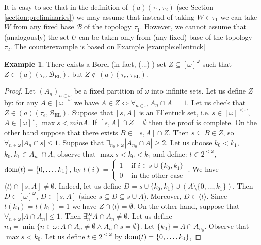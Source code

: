 \documentclass[12pt]{amsart}
\theoremstyle{plain}
\theoremstyle{definition}
\newtheorem{example}[theorem]{Example}
\theoremstyle{remark}
\newcommand{\dom}{{\rm dom}}
\newcommand{\finsub}{[\omega]^{<\omega}}
\newcommand{\infsub}{[\omega]^{\omega}}
\newcommand{\cB}{{\mathcal B}}
\newcommand{\aideal}{\mathit{(a)}}
\newcommand{\tauEllentuck}{\tau_{\mathrm{EL}}}
\newcommand{\baseEllentuck}{\cB_{\mathrm{EL}}}
\newcommand{\ninomega}{n\in\omega}
\begin{document}
It is easy to see that in the definition of $\aideal(\tau_1, \tau_2)$
(see Section \ref{section:preliminaries})
we may assume that instead of taking $W \in \tau_1$
we can take $W$ from any fixed base $\cB$ of the topology
$\tau_1$. However, we cannot assume that (analogously)
the set $U$ can be taken only from (any fixed) base of
the topology $\tau_2$. The counterexample is based 
on Example \ref{example:ellentuck}

\begin{example}
There exists a Borel (in fact,
(...)%
) set $Z \subseteq \infsub$ such that 
$Z \in \aideal(\tau_e, \baseEllentuck)$, but
$Z \not\in \aideal(\tau_e, \tauEllentuck)$.
\end{example}

\begin{proof}
Let $(A_n)_{n\in\omega}$ be a fixed partition of $\omega$ into infinite sets. 
Let us define $Z$ by:
for any $A\in\infsub$ 
we have $A\in Z \iff \forall_{n\in\omega} |A_n \cap A| = 1$.
Let us check that $Z\in\aideal(\tau_e, \baseEllentuck)$.
Suppose that $[s, A]$ is an Ellentuck set, i.e. $s\in\finsub$, $A\in\infsub$, $\max s < min A$. 
If $[s, A] \cap Z = \emptyset$ then
the proof is complete. On the other hand suppose that there exists $B \in [s, A] \cap Z$. Then $s \subseteq B \in Z$, so $\forall_{
\ninomega} |A_n \cap s| \leq 1$.
Suppose that $\exists_{n_0\in\omega} |A_{n_0} \cap A| \geq 2$. Let us choose $k_0 < k_1$, $k_0, k_1 \in A_{n_0} \cap A$, observe that $\max s < k_0 < k_1$ and define:
$t \in 2^{<\omega}$, 
$\dom(t) = \lbrace 0, \ldots, k_1\rbrace$, by  
$t(i) = \begin{cases}
     1 & \text{ if } i \in s \cup \lbrace k_0, k_1 \rbrace \\
     0 & \text{ in the other case }
\end{cases}$.
We have $\langle t \rangle \cap [s, A] \not= \emptyset$. Indeed, let us define $D = s \cup \lbrace k_0, k_1 \rbrace \cup (A \setminus \lbrace 0, \ldots, k_1\rbrace)$.
Then $D \in \infsub$, $D \in [s, A]$ (since $s \subseteq D \subseteq s \cup A$). Moreover, $D \in \langle t \rangle$. Since $t(k_0) = t(k_1) = 1$ we have $Z \cap \langle t \rangle = \emptyset$.
On the other hand, suppose that $\forall_{\ninomega} |A \cap A_n| \leq 1$. Then $\exists^\infty_n A \cap A_n \not= \emptyset$.
Let us define 
$n_0 = \min\lbrace \ninomega \colon A \cap A_n \not= \emptyset \wedge A_n \cap s = \emptyset \rbrace$.
Let $\lbrace k_0 \rbrace = A \cap A_{n_0}$. Observe that $\max s < k_0$. Let us define $t \in 2^{<\omega}$ by $\dom(t) = \lbrace 0, \ldots, k_0\rbrace$, 

\end{proof}
\end{document}
